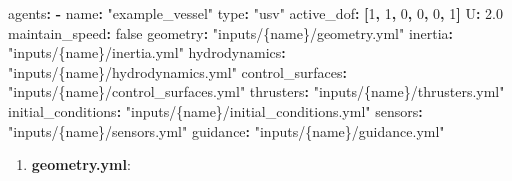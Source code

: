 \documentclass[
  letterpaper,
  DIV=11,
  numbers=noendperiod]{scrreprt}
\newenvironment{Shaded}{\begin{snugshade}}{\end{snugshade}}
\newcommand{\AttributeTok}[1]{\textcolor[rgb]{0.40,0.45,0.13}{#1}}
\newcommand{\CharTok}[1]{\textcolor[rgb]{0.13,0.47,0.30}{#1}}
\newcommand{\DecValTok}[1]{\textcolor[rgb]{0.68,0.00,0.00}{#1}}
\newcommand{\FloatTok}[1]{\textcolor[rgb]{0.68,0.00,0.00}{#1}}
\newcommand{\FunctionTok}[1]{\textcolor[rgb]{0.28,0.35,0.67}{#1}}
\newcommand{\KeywordTok}[1]{\textcolor[rgb]{0.00,0.23,0.31}{\textbf{#1}}}
\newcommand{\StringTok}[1]{\textcolor[rgb]{0.13,0.47,0.30}{#1}}
\providecommand{\tightlist}{%
  \setlength{\itemsep}{0pt}\setlength{\parskip}{0pt}}\usepackage{longtable,booktabs,array}
\begin{document}
\begin{Shaded}
\begin{Highlighting}[]
\FunctionTok{agents}\KeywordTok{:}
\AttributeTok{  }\KeywordTok{{-}}\AttributeTok{ }\FunctionTok{name}\KeywordTok{:}\AttributeTok{ }\StringTok{"example\_vessel"}
\AttributeTok{    }\FunctionTok{type}\KeywordTok{:}\AttributeTok{ }\StringTok{"usv"}
\AttributeTok{    }\FunctionTok{active\_dof}\KeywordTok{:}\AttributeTok{ }\KeywordTok{[}\DecValTok{1}\KeywordTok{,}\AttributeTok{ }\DecValTok{1}\KeywordTok{,}\AttributeTok{ }\DecValTok{0}\KeywordTok{,}\AttributeTok{ }\DecValTok{0}\KeywordTok{,}\AttributeTok{ }\DecValTok{0}\KeywordTok{,}\AttributeTok{ }\DecValTok{1}\KeywordTok{]}
\AttributeTok{    }\FunctionTok{U}\KeywordTok{:}\AttributeTok{ }\FloatTok{2.0}
\AttributeTok{    }\FunctionTok{maintain\_speed}\KeywordTok{:}\AttributeTok{ }\CharTok{false}
\AttributeTok{    }\FunctionTok{geometry}\KeywordTok{:}\AttributeTok{ }\StringTok{"inputs/\{name\}/geometry.yml"}
\AttributeTok{    }\FunctionTok{inertia}\KeywordTok{:}\AttributeTok{ }\StringTok{"inputs/\{name\}/inertia.yml"}
\AttributeTok{    }\FunctionTok{hydrodynamics}\KeywordTok{:}\AttributeTok{ }\StringTok{"inputs/\{name\}/hydrodynamics.yml"}
\AttributeTok{    }\FunctionTok{control\_surfaces}\KeywordTok{:}\AttributeTok{ }\StringTok{"inputs/\{name\}/control\_surfaces.yml"}
\AttributeTok{    }\FunctionTok{thrusters}\KeywordTok{:}\AttributeTok{ }\StringTok{"inputs/\{name\}/thrusters.yml"}
\AttributeTok{    }\FunctionTok{initial\_conditions}\KeywordTok{:}\AttributeTok{ }\StringTok{"inputs/\{name\}/initial\_conditions.yml"}
\AttributeTok{    }\FunctionTok{sensors}\KeywordTok{:}\AttributeTok{ }\StringTok{"inputs/\{name\}/sensors.yml"}
\AttributeTok{    }\FunctionTok{guidance}\KeywordTok{:}\AttributeTok{ }\StringTok{"inputs/\{name\}/guidance.yml"}
\end{Highlighting}
\end{Shaded}

\begin{enumerate}
\def\labelenumi{\arabic{enumi}.}
\setcounter{enumi}{1}
\tightlist
\item
  \textbf{geometry.yml}:
\end{enumerate}
\end{document}
